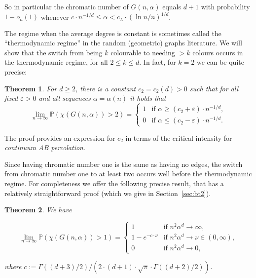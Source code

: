 \documentclass[11pt]{article}%
\newtheorem{theorem}{Theorem} %
\newcommand{\eps}{\varepsilon}
\newcommand{\Pro}{\mathbb{P}}
\begin{document}
\noindent
So in particular the chromatic number of $G(n,\alpha)$ equals $d+1$ with probability $1-o_n(1)$ whenever 
$c \cdot n^{-1/d} \leq \alpha < c_L \cdot (\ln n / n)^{1/d}$.

The regime when the average degree is constant is sometimes called the ``thermodynamic regime'' in the random (geometric) graphs 
literature.
We will show that the switch from being $k$ colourable to needing $>k$ colours 
occurs in the thermodynamic regime, for all $2\leq k \leq d$. 
In fact, for $k=2$ we can be quite precise:


\begin{theorem}\label{bt1}
For $d\geq 2$, there is a constant $c_2=c_2(d)>0 $ such that for all fixed $\eps>0 $ and all sequences $\alpha=\alpha(n)$ 
it holds that
\begin{equation*}
\lim_{n\to\infty}\Pro(\chi(G({n},\alpha)) > 2)=\begin{cases}
1 & \text{if }\alpha\geq (c_2+\eps)\cdot n^{-1/d},\\
0 & \text{if }\alpha\leq (c_2-\eps)\cdot n^{-1/d}.
\end{cases}
\end{equation*}
\end{theorem}

\noindent
The proof provides an expression for $c_2$ in terms of the critical intensity for %
{\em continuum AB percolation}.

Since having chromatic number one is the same as having no edges, the switch from chromatic number one to 
at least two occurs well before the thermodynamic regime.
For completeness we offer the following precise result, that has a relatively straightforward proof 
(which we give in Section~\ref{sec:bt2}).


\begin{theorem}\label{bt2}
We have

$$
\lim_{n\to\infty}\Pro(\chi(G({n},\alpha)) > 1)
=\begin{cases}
    1 & \text{if }n^2\alpha^d\to \infty,\\
    1-e^{- c \cdot \nu} & \text{if }n^2\alpha^d\to \nu \in (0,\infty), \\
    0 & \text{if } n^2\alpha^d\to 0,
\end{cases}
$$

\noindent
where $c := \Gamma((d+3)/2) / \left( 2 \cdot (d+1)\cdot \sqrt{\pi} \cdot \Gamma((d+2)/2) \right)$.
\end{theorem}
\end{document}
